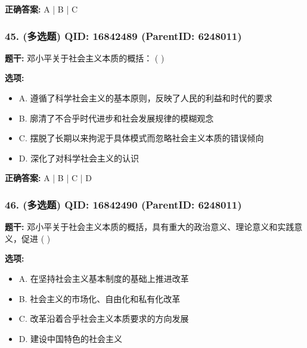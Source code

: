 \documentclass[12pt,UTF8]{ctexart}
\begin{document}
\textbf{正确答案:}
A | B | C

\vspace{0.3em}\hrulefill\vspace{0.7em}

\subsubsection*{45. (多选题) \small QID: 16842489 (ParentID: 6248011)}

\textbf{题干:}
邓小平关于社会主义本质的概括： ( )



\textbf{选项:}
\begin{itemize}[leftmargin=*]

  \item A. 遵循了科学社会主义的基本原则，反映了人民的利益和时代的要求

  \item B. 廓清了不合乎时代进步和社会发展规律的模糊观念

  \item C. 摆脱了长期以来拘泥于具体模式而忽略社会主义本质的错误倾向

  \item D. 深化了对科学社会主义的认识

\end{itemize}

\textbf{正确答案:}
A | B | C | D

\vspace{0.3em}\hrulefill\vspace{0.7em}

\subsubsection*{46. (多选题) \small QID: 16842490 (ParentID: 6248011)}

\textbf{题干:}
邓小平关于社会主义本质的概括，具有重大的政治意义、理论意义和实践意义，促进 ( )



\textbf{选项:}
\begin{itemize}[leftmargin=*]

  \item A. 在坚持社会主义基本制度的基础上推进改革

  \item B. 社会主义的市场化、自由化和私有化改革

  \item C. 改革沿着合乎社会主义本质要求的方向发展

  \item D. 建设中国特色的社会主义

\end{itemize}
\end{document}
